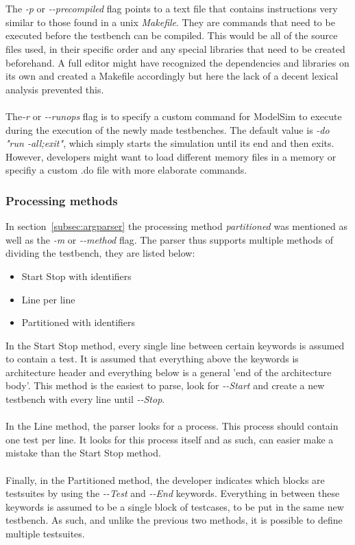 \documentclass[11pt,british]{article}
\begin{document}
\\
\\
The \emph{-p} or \emph{-\--precompiled} flag points to a text file that contains instructions very similar to those found in a unix \emph{Makefile}. They are commands that need to be executed before the testbench can be compiled. This would be all of the source files used, in their specific order and any special libraries that need to be created beforehand. A full editor might have recognized the dependencies and libraries on its own and created a Makefile accordingly but here the lack of a decent lexical analysis prevented this.
\\
\\
The\emph{-r} or \emph{-\--runops} flag is to specify a custom command for ModelSim to execute during the execution of the newly made testbenches. The default value is \emph{-do "run -all;exit"}, which simply starts the simulation until its end and then exits. However, developers might want to load different memory files in a memory or specifiy a custom .do file with more elaborate commands.

\subsubsection{Processing methods}
\label{subsubsec:processmethods}
In section~\ref{subsec:argparser} the processing method \emph{partitioned} was mentioned as well as the \emph{-m} or \emph{-\--method} flag. The parser thus supports multiple methods of dividing the testbench, they are listed below:
\begin{itemize}[itemsep=-0.1cm]
\item Start Stop with identifiers
\item Line per line 
\item Partitioned with identifiers
\end{itemize}
In the Start Stop method, every single line between certain keywords is assumed to contain a test. It is assumed that everything above the keywords is architecture header and everything below is a general 'end of the architecture body'. This method is the easiest to parse, look for \emph{-\--Start} and create a new testbench with every line until \emph{-\--Stop}.
\\
\\
In the Line method, the parser looks for a process. This process should contain one test per line. It looks for this process itself and as such, can easier make a mistake than the Start Stop method.
\\
\\
Finally, in the Partitioned method, the developer indicates which blocks are testsuites by using the \emph{-\--Test} and \emph{-\--End} keywords. Everything in between these keywords is assumed to be a single block of testcases, to be put in the same new testbench. As such, and unlike the previous two methods, it is possible to define multiple testsuites. 
\end{document}
